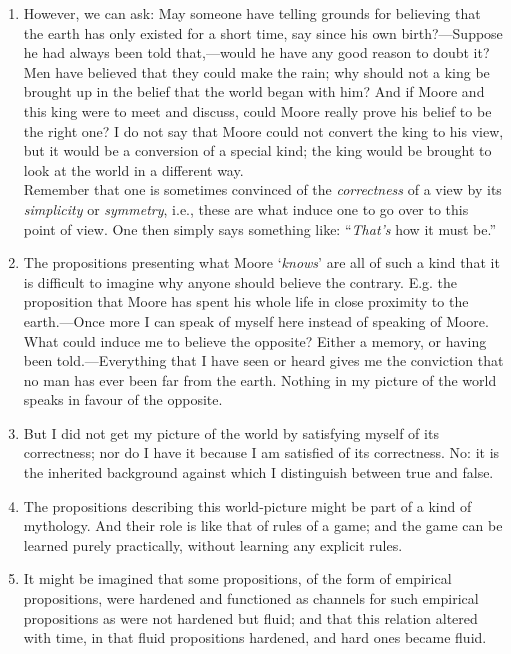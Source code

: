 \documentclass{book}
\begin{document}
\begin{enumerate}
\item
However, we can ask: May someone have telling grounds for believing that the
earth has only existed for a short time, say since his own birth?---Suppose he
had always been told that,---would he have any good reason to doubt it? Men
have believed that they could make the rain; why should not a king be brought
up in the belief that the world began with him? And if Moore and this king were
to meet and discuss, could Moore really prove his belief to be the right one? I
do not say that Moore could not convert the king to his view, but it would be a
conversion of a special kind; the king would be brought to look at the world in
a different way. \\
Remember that one is sometimes convinced of the \emph{correctness} of a view by
its \emph{simplicity} or \emph{symmetry}, i.e., these are what induce one to go
over to this point of view. One then simply says something like:
``\emph{That's} how it must be.''

\item
The propositions presenting what Moore `\emph{knows}' are all of such a kind
that it is difficult to imagine why anyone should believe the contrary. E.g.
the proposition that Moore has spent his whole life in close proximity to the
earth.---Once more I can speak of myself here instead of speaking of Moore.
What could induce me to believe the opposite? Either a memory, or having been
told.---Everything that I have seen or heard gives me the conviction that no
man has ever been far from the earth. Nothing in my picture of the world speaks
in favour of the opposite.

\item
But I did not get my picture of the world by satisfying myself of its
correctness; nor do I have it because I am satisfied of its correctness. No: it
is the inherited background against which I distinguish between true and false.

\item
The propositions describing this world-picture might be part of a kind of
mythology. And their role is like that of rules of a game; and the game can be
learned purely practically, without learning any explicit rules.

\item
It might be imagined that some propositions, of the form of empirical
propositions, were hardened and functioned as channels for such empirical
propositions as were not hardened but fluid; and that this relation altered
with time, in that fluid propositions hardened, and hard ones became fluid.


\end{enumerate}
\end{document}

